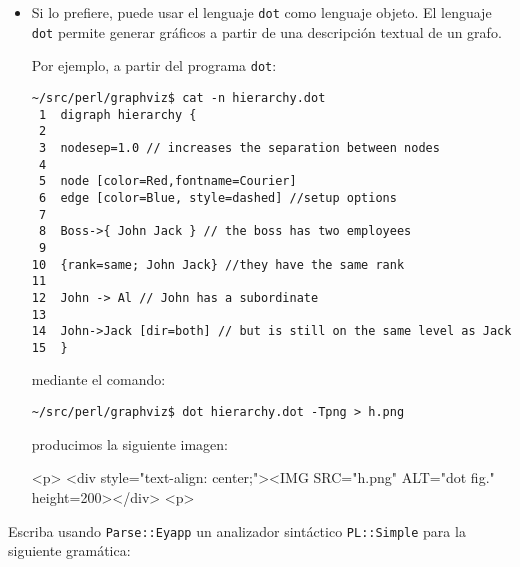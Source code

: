 \begin{itemize}
\item Si lo prefiere, puede usar el lenguaje \verb|dot| como 
lenguaje objeto. El lenguaje \verb|dot| permite generar gráficos 
a partir de una descripción textual de un grafo.

Por ejemplo, a partir del programa \verb|dot|:
\begin{verbatim}
~/src/perl/graphviz$ cat -n hierarchy.dot 
 1  digraph hierarchy {
 2  
 3  nodesep=1.0 // increases the separation between nodes
 4  
 5  node [color=Red,fontname=Courier]
 6  edge [color=Blue, style=dashed] //setup options
 7  
 8  Boss->{ John Jack } // the boss has two employees
 9  
10  {rank=same; John Jack} //they have the same rank
11  
12  John -> Al // John has a subordinate 
13  
14  John->Jack [dir=both] // but is still on the same level as Jack
15  }
\end{verbatim}
mediante el comando:
\begin{verbatim}
~/src/perl/graphviz$ dot hierarchy.dot -Tpng > h.png
\end{verbatim}
producimos la siguiente imagen:
\begin{rawhtml}
<p>
<div style="text-align: center;"><IMG SRC="h.png" ALT="dot fig." height=200></div>
<p>
\end{rawhtml}
\end{itemize}

\label{practica:gramasimpleeneyapp}

Escriba usando \verb|Parse::Eyapp|
un analizador sintáctico \verb|PL::Simple| para la siguiente gramática:


